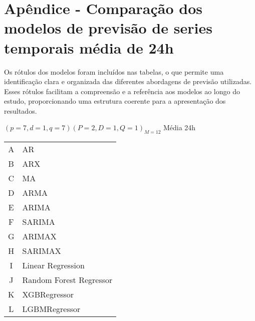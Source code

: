 
\section{Ap\^endice - Compara\c c\~ao dos modelos de previs\~ao de series temporais m\'edia de 24h}\label{sec:comtb24}


Os rótulos dos modelos foram incluídos nas tabelas, o que permite uma identificação clara e organizada das diferentes abordagens de previsão utilizadas. Esses rótulos facilitam a compreensão e a referência aos modelos ao longo do estudo, proporcionando uma estrutura coerente para a apresentação dos resultados.

$(p = 7,d = 1,q = 7) (P = 2,D = 1,Q = 1)_{M = 12}$ Média 24h
 
\begin{table}[H]
	\begin{tabular}{@{}cl@{}}
		A & AR                      \\
		B & ARX                     \\
		C & MA                      \\
		D & ARMA                    \\
		E & ARIMA                   \\
		F & SARIMA                  \\
		G & ARIMAX                  \\
		H & SARIMAX                 \\
		I & Linear Regression       \\
		J & Random Forest Regressor \\
		K & XGBRegressor            \\
		L & LGBMRegressor          
	\end{tabular}
\end{table}

\newpage

